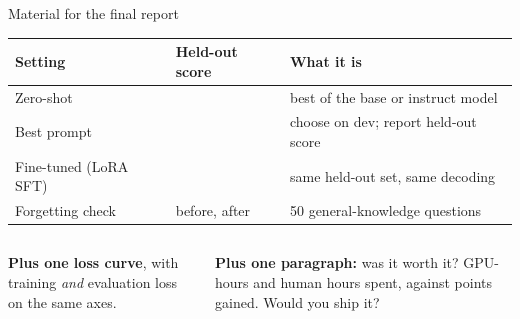 \documentclass[aspectratio=169,10pt]{beamer}
\begin{document}
\begin{frame}{Material for the final report}
  \centering
  \begin{tabular}{@{}L{4.4cm} C{2.4cm} L{4.2cm}@{}}
    \toprule
    \textbf{Setting} & \textbf{Held-out score} & \textbf{What it is}\\
    \midrule
    Zero-shot & & best of the base or instruct model\\
    \addlinespace[0.2em]
    Best prompt & & choose on dev; report held-out score\\
    \addlinespace[0.2em]
    Fine-tuned (LoRA SFT) & & same held-out set, same decoding\\
    \addlinespace[0.2em]
    Forgetting check & before, after & 50 general-knowledge questions\\
    \bottomrule
  \end{tabular}
  \vspace{0.5em}

  \begin{columns}[T]
    \begin{column}{0.48\textwidth}
      \textbf{Plus one loss curve}, with training \emph{and} evaluation loss
      on the same axes.
    \end{column}
    \begin{column}{0.52\textwidth}
      \textbf{Plus one paragraph:} was it worth it? GPU-hours and human hours
      spent, against points gained. Would you ship it?
    \end{column}
  \end{columns}
\end{frame}
\end{document}
